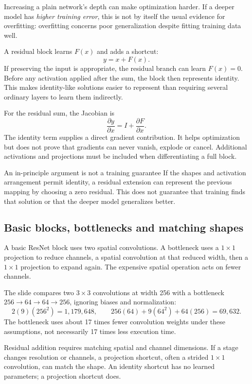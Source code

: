 Increasing a plain network's depth can make optimization harder. If a deeper model has \emph{higher training error}, this is not by itself the usual evidence for overfitting: overfitting concerns poor generalization despite fitting training data well.

A residual block learns $F(x)$ and adds a shortcut:
\[
y=x+F(x).
\]
If preserving the input is appropriate, the residual branch can learn $F(x)=0$. Before any activation applied after the sum, the block then represents identity. This makes identity-like solutions easier to represent than requiring several ordinary layers to learn them indirectly.

For the residual sum, the Jacobian is
\[
\frac{\partial y}{\partial x}=I+\frac{\partial F}{\partial x}.
\]
The identity term supplies a direct gradient contribution. It helps optimization but does not prove that gradients can never vanish, explode or cancel. Additional activations and projections must be included when differentiating a full block.
\begin{careful}{An in-principle argument is not a training guarantee}
If the shapes and activation arrangement permit identity, a residual extension can represent the previous mapping by choosing a zero residual. This does not guarantee that training finds that solution or that the deeper model generalizes better.
\end{careful}

\subsection{Basic blocks, bottlenecks and matching shapes}
A basic ResNet block uses two spatial convolutions. A bottleneck uses a $1\times1$ projection to reduce channels, a spatial convolution at that reduced width, then a $1\times1$ projection to expand again. The expensive spatial operation acts on fewer channels.

The slide compares two $3\times3$ convolutions at width 256 with a bottleneck $256\to64\to64\to256$, ignoring biases and normalization:
\[
2(9)(256^2)=1{,}179{,}648,\qquad
256(64)+9(64^2)+64(256)=69{,}632.
\]
The bottleneck uses about 17 times fewer convolution weights under these assumptions, not necessarily 17 times less execution time.

Residual addition requires matching spatial and channel dimensions. If a stage changes resolution or channels, a projection shortcut, often a strided $1\times1$ convolution, can match the shape. An identity shortcut has no learned parameters; a projection shortcut does.

